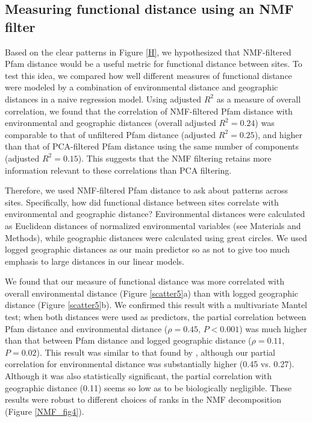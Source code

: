 
\subsection{Measuring functional distance using an NMF filter}

Based on the clear patterns in Figure \ref{H}, we hypothesized that NMF-filtered Pfam distance would be a useful metric for functional distance between sites. To test this idea, we compared how well different measures of functional distance were modeled by a combination of environmental distance and geographic distances in a naive regression model.  Using adjusted $R^2$ as a measure of overall correlation, we found that the correlation of NMF-filtered Pfam distance with environmental and geographic distances (overall adjusted $R^2 = 0.24$) was comparable to that of unfiltered Pfam distance (adjusted $R^2 = 0.25$), and higher than that of PCA-filtered Pfam distance using the same number of components (adjusted $R^2 = 0.15$). This suggests that the NMF filtering retains more information relevant to these correlations than PCA filtering.

Therefore, we used NMF-filtered Pfam distance to ask about patterns across sites. Specifically, how did functional distance between sites correlate with environmental and geographic distance?  Environmental distances were calculated as Euclidean distances of normalized environmental variables (see Materials and Methods), while geographic distances were calculated using great circles. We used logged geographic distances as our main predictor so as not to give too much emphasis to large distances in our linear models.

We found that our measure of functional distance was more correlated with overall environmental distance (Figure \ref{scatter5}a) than with logged geographic distance (Figure \ref{scatter5}b). We confirmed this result with a multivariate Mantel test; when both distances were used as predictors, the partial correlation between Pfam distance and environmental distance ($\rho=0.45$, $P < 0.001$) was much higher than that between Pfam distance and logged geographic distance ($\rho=0.11$, $P=0.02$). This result was similar to that found by \cite{RaesLetu11}, although our partial correlation for environmental distance was substantially higher (0.45 vs. 0.27).  Although it was also statistically significant, the partial correlation with geographic distance (0.11) seems so low as to be biologically negligible. These results were robust to different choices of ranks in the NMF decomposition (Figure \ref{NMF_fig4}).

